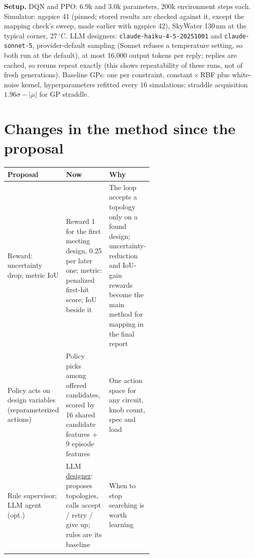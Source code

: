 \documentclass[10pt]{article}
\newcommand{\rowrule}{\specialrule{0.3pt}{1.5pt}{1.5pt}}
\begin{document}
\textbf{Setup.} DQN and PPO: 6.9k and 3.0k parameters, 200k environment steps each.
Simulator: ngspice 41 (pinned; stored results are checked against it, except the mapping check's sweep, made earlier with ngspice 42), SkyWater 130\,nm at the typical corner,
27\,$^\circ$C. LLM designers: \texttt{claude-haiku-4-5-20251001} and \texttt{claude-sonnet-5}, provider-default
sampling (Sonnet refuses a temperature setting, so both run at the default), at most 16,000 output tokens per reply;
replies are cached, so reruns repeat exactly (this shows repeatability of these runs, not of fresh generations). Baseline GPs: one per constraint, constant\,$\times$\,RBF plus white-noise
kernel, hyperparameters refitted every 16 simulations; straddle acquisition $1.96\sigma - |\mu|$ for GP straddle.

\section{Changes in the method since the proposal}\label{app:changes}
{\small\noindent
\begin{tabularx}{\linewidth}{@{}L{0.2\linewidth}L{0.38\linewidth}Y@{}}
\toprule
Proposal & Now & Why \\
\midrule
Reward: uncertainty drop; metric IoU & Reward 1 for the first meeting design, 0.25 per later one; metric: penalized first-hit score; IoU beside it & The loop accepts a topology only on a found design; uncertainty-reduction and IoU-gain rewards become the main method for mapping in the final report \\ \rowrule
Policy acts on design variables (reparameterized actions) & Policy picks among offered candidates, scored by 16 shared candidate features + 9 episode features & One action space for any circuit, knob count, spec and load \\ \rowrule
Rule supervisor; LLM agent (opt.) & LLM \uline{designer}: proposes topologies, calls accept / retry / give up; rules are its baseline & When to stop searching is worth learning \\ \rowrule
\bottomrule
\end{tabularx}\par}
\end{document}
